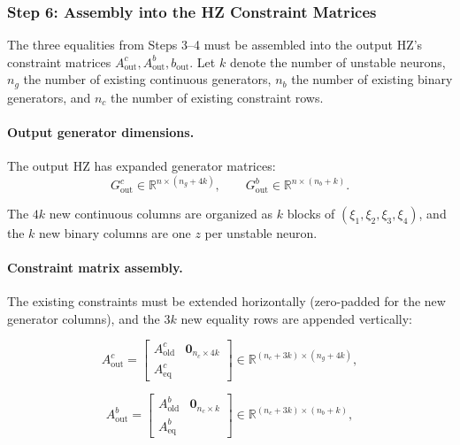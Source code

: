 \documentclass{article}
\begin{document}
\subsubsection{Step 6: Assembly into the HZ Constraint Matrices}
\label{sec:step6_assembly}


The three equalities from Steps 3--4 must be assembled into the output HZ's constraint matrices $A^c_{\mathrm{out}}, A^b_{\mathrm{out}}, b_{\mathrm{out}}$. Let $k$ denote the number of unstable neurons, $n_g$ the number of existing continuous generators, $n_b$ the number of existing binary generators, and $n_c$ the number of existing constraint rows.

\paragraph{Output generator dimensions.}

The output HZ has expanded generator matrices:
\begin{equation}
G^c_{\mathrm{out}} \in \mathbb{R}^{n \times (n_g + 4k)}, \qquad
G^b_{\mathrm{out}} \in \mathbb{R}^{n \times (n_b + k)}.
\end{equation}

The $4k$ new continuous columns are organized as $k$ blocks of $(\xi_1, \xi_2, \xi_3, \xi_4)$, and the $k$ new binary columns are one $z$ per unstable neuron.

\paragraph{Constraint matrix assembly.}

The existing constraints must be extended horizontally (zero-padded for the new generator columns), and the $3k$ new equality rows are appended vertically:

\begin{equation}
\label{eq:case3_Ac_assembly}
A^c_{\mathrm{out}} =
\begin{bmatrix}
A^c_{\mathrm{old}} & \mathbf{0}_{n_c \times 4k} \\[4pt]
\hline
A^c_{\mathrm{eq}}
\end{bmatrix}
\in \mathbb{R}^{(n_c + 3k) \times (n_g + 4k)},
\end{equation}

\begin{equation}
\label{eq:case3_Ab_assembly}
A^b_{\mathrm{out}} =
\begin{bmatrix}
A^b_{\mathrm{old}} & \mathbf{0}_{n_c \times k} \\[4pt]
\hline
A^b_{\mathrm{eq}}
\end{bmatrix}
\in \mathbb{R}^{(n_c + 3k) \times (n_b + k)},
\end{equation}
\end{document}
